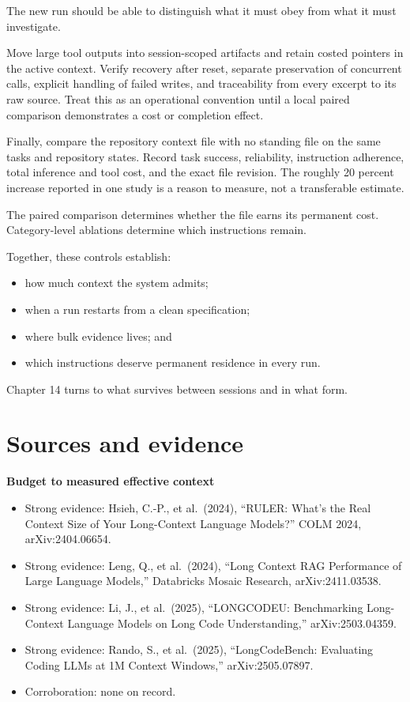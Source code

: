 The new run should be able to distinguish what it must obey from what it must investigate.

Move large tool outputs into session-scoped artifacts and retain costed pointers in the active context. Verify recovery after reset, separate preservation of concurrent calls, explicit handling of failed writes, and traceability from every excerpt to its raw source. Treat this as an operational convention until a local paired comparison demonstrates a cost or completion effect.

Finally, compare the repository context file with no standing file on the same tasks and repository states. Record task success, reliability, instruction adherence, total inference and tool cost, and the exact file revision. The roughly 20 percent increase reported in one study is a reason to measure, not a transferable estimate.

The paired comparison determines whether the file earns its permanent cost. Category-level ablations determine which instructions remain.

Together, these controls establish:

\begin{itemize}
\tightlist
\item
  how much context the system admits;
\item
  when a run restarts from a clean specification;
\item
  where bulk evidence lives; and
\item
  which instructions deserve permanent residence in every run.
\end{itemize}

Chapter 14 turns to what survives between sessions and in what form.

\section*{Sources and evidence}

\textbf{Budget to measured effective context}

\begin{itemize}
\tightlist
\item
  Strong evidence: Hsieh, C.-P., et al.~(2024), ``RULER: What's the Real Context Size of Your Long-Context Language Models?'' COLM 2024, arXiv:2404.06654.
\item
  Strong evidence: Leng, Q., et al.~(2024), ``Long Context RAG Performance of Large Language Models,'' Databricks Mosaic Research, arXiv:2411.03538.
\item
  Strong evidence: Li, J., et al.~(2025), ``LONGCODEU: Benchmarking Long-Context Language Models on Long Code Understanding,'' arXiv:2503.04359.
\item
  Strong evidence: Rando, S., et al.~(2025), ``LongCodeBench: Evaluating Coding LLMs at 1M Context Windows,'' arXiv:2505.07897.
\item
  Corroboration: none on record.
\end{itemize}


